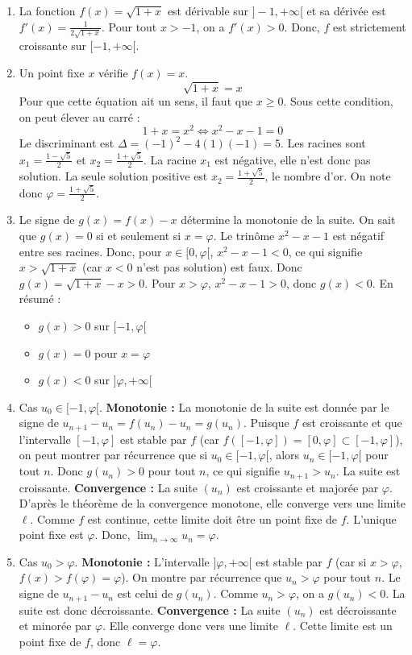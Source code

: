 \documentclass[solutions]{exercices}
\begin{document}
\begin{solution}
\begin{enumerate}
    \item La fonction $f(x)=\sqrt{1+x}$ est dérivable sur $]-1, +\infty[$ et sa dérivée est $f'(x) = \frac{1}{2\sqrt{1+x}}$.
    Pour tout $x > -1$, on a $f'(x) > 0$. Donc, $f$ est strictement croissante sur $[-1, +\infty[$.
    \item Un point fixe $x$ vérifie $f(x)=x$.
    \[ \sqrt{1+x} = x \]
    Pour que cette équation ait un sens, il faut que $x \ge 0$. Sous cette condition, on peut élever au carré :
    \[ 1+x = x^2 \iff x^2 - x - 1 = 0 \]
    Le discriminant est $\Delta = (-1)^2 - 4(1)(-1) = 5$. Les racines sont $x_1 = \frac{1-\sqrt{5}}{2}$ et $x_2 = \frac{1+\sqrt{5}}{2}$.
    La racine $x_1$ est négative, elle n'est donc pas solution. La seule solution positive est $x_2 = \frac{1+\sqrt{5}}{2}$, le nombre d'or.
    On note donc $\varphi = \frac{1+\sqrt{5}}{2}$.
    \item Le signe de $g(x)=f(x)-x$ détermine la monotonie de la suite. On sait que $g(x)=0$ si et seulement si $x=\varphi$.
    Le trinôme $x^2-x-1$ est négatif entre ses racines. Donc, pour $x \in [0, \varphi[$, $x^2-x-1 < 0$, ce qui signifie $x > \sqrt{1+x}$ (car $x<0$ n'est pas solution) est faux. Donc $g(x)=\sqrt{1+x}-x > 0$.
    Pour $x > \varphi$, $x^2-x-1 > 0$, donc $g(x) < 0$.
    En résumé :
    \begin{itemize}
        \item $g(x) > 0$ sur $[-1, \varphi[$
        \item $g(x) = 0$ pour $x = \varphi$
        \item $g(x) < 0$ sur $]\varphi, +\infty[$
    \end{itemize}
    \item Cas $u_0 \in [-1, \varphi[$.
    \textbf{Monotonie :} La monotonie de la suite est donnée par le signe de $u_{n+1}-u_n = f(u_n)-u_n = g(u_n)$.
    Puisque $f$ est croissante et que l'intervalle $[-1, \varphi]$ est stable par $f$ (car $f([-1,\varphi]) = [0, \varphi] \subset [-1, \varphi]$), on peut montrer par récurrence que si $u_0 \in [-1, \varphi[$, alors $u_n \in [-1, \varphi[$ pour tout $n$.
    Donc $g(u_n) > 0$ pour tout $n$, ce qui signifie $u_{n+1} > u_n$. La suite est croissante.
    \textbf{Convergence :} La suite $(u_n)$ est croissante et majorée par $\varphi$. D'après le théorème de la convergence monotone, elle converge vers une limite $\ell$.
    Comme $f$ est continue, cette limite doit être un point fixe de $f$. L'unique point fixe est $\varphi$. Donc, $\lim_{n\to\infty} u_n = \varphi$.
    \item Cas $u_0 > \varphi$.
    \textbf{Monotonie :} L'intervalle $]\varphi, +\infty[$ est stable par $f$ (car si $x>\varphi$, $f(x)>f(\varphi)=\varphi$). On montre par récurrence que $u_n > \varphi$ pour tout $n$.
    Le signe de $u_{n+1}-u_n$ est celui de $g(u_n)$. Comme $u_n > \varphi$, on a $g(u_n) < 0$. La suite est donc décroissante.
    \textbf{Convergence :} La suite $(u_n)$ est décroissante et minorée par $\varphi$. Elle converge donc vers une limite $\ell$.
    Cette limite est un point fixe de $f$, donc $\ell=\varphi$.
\end{enumerate}
\end{solution}
\end{document}
